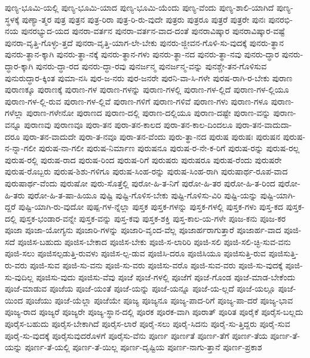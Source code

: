 {ಪುಣ್ಯ-ಭೂಮಿ-ಯಲ್ಲಿ
ಪುಣ್ಯ-ಭೂಮಿ-ಯಾದ
ಪುಣ್ಯ-ಭೂಮಿ-ಯೆಂದು
ಪುಣ್ಯ-ವೆಂದು
ಪುಣ್ಯ-ಶಾಲಿ-ಯಾಗಿದೆ
ಪುಣ್ಯ-ಸ್ಥಳಕ್ಕೆ
ಪುಣ್ಯಾ-ತ್ಮರ
ಪುತ್ರ
ಪುತ್ರನ
ಪುತ್ರ-ರಿರಾ
ಪುತ್ರ-ರಿ-ರು-ವುದೇ
ಪುತ್ರರು
ಪುತ್ರರೂ
ಪುತ್ರರೆ
ಪುತ್ರರೇ
ಪುನಃ
ಪುನರಭಿ-ನಯ
ಪುನರಭ್ಯುದ-ಯದ
ಪುನರಾ-ವರ್ತನ
ಪುನರಾ-ವರ್ತನ-ವಾದ-ದಂತೆ
ಪುನರಾವಿಷ್ಕಾರ
ಪುನರಾವಿಷ್ಕಾರ-ವಷ್ಟೆ
ಪುನರಾ-ವೃತ್ತಿ-ಗೊಳ್ಳು-ತ್ತದೆ
ಪುನರಾ-ವೃತ್ತಿ-ಯಾಗ-ಲೇ-ಬೇಕು
ಪುನರು-ಜ್ಜೀವನ-ಗೊಳಿ-ಸು-ವುದಕ್ಕೆ
ಪುನರು-ತ್ಥಾನ
ಪುನರು-ತ್ಥಾನ-ಕ್ಕಾಗಿ
ಪುನರು-ತ್ಥಾ-ನಕ್ಕೆ
ಪುನರು-ತ್ಥಾನ-ಗಳು
ಪುನರು-ತ್ಥಾ-ನದ
ಪುನರು-ತ್ಥಾ-ನವು
ಪುನರು-ದ್ಧಾರ
ಪುನರು-ದ್ಧಾರ-ಕ್ಕಾಗಿ
ಪುನರು-ದ್ಧಾ-ರದ
ಪುನರು-ದ್ಧಾ-ರವು
ಪುನರ್ಜನ್ಮ
ಪುನರ್ಜನ್ಮ-ವನ್ನು
ಪುನಶ್ಚೇ-ತನ-ಗೊಳಿಸುವ
ಪುನುರುದ್ಧಾರ-ಕ್ಕಿಂತ
ಪುಮಾ-ನಸಿ
ಪುರ-ಜ-ನರು
ಪುರ-ಜನರೇ
ಪುರನಿ-ವಾ-ಸಿ-ಗಳೇ
ಪುರಷ-ರಾಗಿ-ರ-ಬೇಕು
ಪುರಾಣ
ಪುರಾಣಕ್ಕೂ
ಪುರಾಣಕ್ಕೆ
ಪುರಾಣ-ಗಳ
ಪುರಾಣ-ಗಳನ್ನು
ಪುರಾಣ-ಗಳಲ್ಲಿ
ಪುರಾಣ-ಗಳ-ಲ್ಲಿದೆ
ಪುರಾಣ-ಗಳ-ಲ್ಲಿಯೂ
ಪುರಾಣ-ಗಳ-ಲ್ಲಿ-ರುವ
ಪುರಾಣ-ಗಳ-ಲ್ಲಿವೆ
ಪುರಾಣ-ಗಳಿಗೆ
ಪುರಾಣ-ಗಳಿವೆ
ಪುರಾಣ-ಗಳು
ಪುರಾಣ-ಗಳೂ
ಪುರಾಣ-ಗಳೆಲ್ಲಾ
ಪುರಾಣ-ಗಳೇನೋ
ಪುರಾಣದ
ಪುರಾಣ-ದಲ್ಲಿ
ಪುರಾಣ-ದಲ್ಲಿಯೂ
ಪುರಾಣ-ದಷ್ಟೇ
ಪುರಾಣ-ವನ್ನು
ಪುರಾಣ-ವನ್ನೂ
ಪುರಾಣವು
ಪುರಾಣವೂ
ಪುರಾ-ತನ
ಪುರಾ-ತನ-ಕಾಲದ
ಪುರಾ-ತನ-ಕಾಲ-ದಿಂದಲೂ
ಪುರಾ-ತನ-ವಾದುದಾ-ದರೂ
ಪುರಾ-ತನ-ವಾದುದೇ
ಪುರಾ-ತ-ನವೂ
ಪುರಾ-ತನ-ವೆಂದು
ಪುರು-ತ್ಥಾ-ನದ
ಪುರುಷ
ಪುರುಷಃ
ಪುರುಷನ
ಪುರುಷ-ನ-ನ್ನಾ-ಗಲೀ
ಪುರುಷ-ನಾ-ಗಲೀ
ಪುರುಷ-ನಿರ್ಮಾಣ
ಪುರುಷನೂ
ಪುರುಷ-ರ-ನೇ-ಕ-ರಿಗೆ
ಪುರುಷ-ರನ್ನು
ಪುರುಷ-ರಲ್ಲ
ಪುರುಷ-ರಲ್ಲಿ
ಪುರುಷ-ರಾದ
ಪುರುಷ-ರಿಂದ
ಪುರುಷ-ರಿಗೆ
ಪುರುಷರು
ಪುರುಷರೂ
ಪುರುಷ-ರೆಂದು
ಪುರುಷರೇ
ಪುರುಷ-ರೊಬ್ಬರು
ಪುರುಷ-ಶಿಶು-ಗಳಿಗೂ
ಪುರುಷ-ಸಿಂಹ-ರನ್ನು
ಪುರುಷ-ಸಿಂಹ-ರಾಗಿ
ಪುರುಷಾರ್ಥ-ರೂಪ-ವಾದ
ಪುರುಷಾರ್ಥ-ವೆಂದು
ಪುರುಷೋ
ಪುರು-ಸೊತ್ತೆಲ್ಲಿ
ಪುರೋ-ಹಿ-ತ-ನಿಗೆ
ಪುರೋ-ಹಿ-ತರ
ಪುರೋ-ಹಿ-ತ-ರಿಂದ
ಪುರೋ-ಹಿ-ತರು
ಪುರೋ-ಹಿ-ತ-ಷಾ-ಹಿಯೂ
ಪುಷ್ಟಿ
ಪುಷ್ಟಿ-ಗೊಳಿಸ-ಬೇಕು
ಪುಷ್ಟಿ-ಗೊಳಿಸು-ವಿರಿ
ಪುಷ್ಟಿ-ಯನ್ನು
ಪುಷ್ಟಿ-ಯಾಗಿ-ದ್ದರೆ
ಪುಷ್ಟಿ-ಯಾಗಿ-ರು-ವುದೋ
ಪುಷ್ಪ-ಗಳ-ನ್ನೆಲ್ಲಾ
ಪುಸ್ತಕ
ಪುಸ್ತಕ-ಗಳನ್ನು
ಪುಸ್ತಕ-ಗಳಲ್ಲಿ
ಪುಸ್ತಕ-ಗಳು
ಪುಸ್ತ-ಕದ
ಪುಸ್ತಕ-ದಲ್ಲಿ
ಪುಸ್ತಕ-ಭಂಡಾರ-ವನ್ನೇ
ಪುಸ್ತಕ-ವನ್ನು
ಪುಸ್ತ-ಕವು
ಪುಸ್ತಕ-ಶಕ್ತಿ
ಪುಸ್ತ-ಕಾಲ-ಯ-ಗಳೇ
ಪೂಜ-ಕನು
ಪೂಜ-ಕರ
ಪೂಜಾ
ಪೂಜಾ-ಯೋಗ್ಯನು
ಪೂಜಾರಿ-ಗಳನ್ನು
ಪೂಜಾರಿ-ವೃಂದ-ವೆಲ್ಲ
ಪೂಜಾರ್ಹರಾಗುತ್ತಾರೆ
ಪೂಜಾರ್ಹ-ವಾದ
ಪೂಜಿ-ಸದೆ
ಪೂಜಿಸ-ಬಹುದು
ಪೂಜಿಸ-ಬೇಕಾದ
ಪೂಜಿಸ-ಬೇಕು
ಪೂಜಿ-ಸ-ಲಾರಿರಿ
ಪೂಜಿ-ಸಲಿ
ಪೂಜಿ-ಸಲಿ-ಚ್ಛಿ-ಸುವ-ವನು
ಪೂಜಿ-ಸಲು
ಪೂಜಿಸಲ್ಪಡುತ್ತಿ-ರುವಳು
ಪೂಜಿಸ-ಲ್ಪ-ಡುವ
ಪೂಜಿಸಿ-ದರೂ
ಪೂಜಿಸಿಯೂ
ಪೂಜಿಸುತ್ತಿ-ರುವ
ಪೂಜಿಸುತ್ತಿ-ರು-ವರು
ಪೂಜಿ-ಸುವ
ಪೂಜಿ-ಸು-ವನು
ಪೂಜಿ-ಸು-ವರು
ಪೂಜಿಸು-ವರೊ
ಪೂಜಿ-ಸುವ-ವರು
ಪೂಜಿ-ಸು-ವುದಕ್ಕೆ
ಪೂಜಿ-ಸು-ವುದಿಲ್ಲ
ಪೂಜಿಸು-ವುದು
ಪೂಜಿಸು-ವೆವು
ಪೂಜೆ
ಪೂಜೆ-ಗಳಲ್ಲಿ
ಪೂಜೆಗೆ
ಪೂಜೆ-ಗೊಂಡ
ಪೂಜೆ-ಮಾಡ-ಬೇಕೆಂದು
ಪೂಜೆ-ಮಾಡುವ
ಪೂಜೆಯ
ಪೂಜೆ-ಯಂತೆ
ಪೂಜೆ-ಯನ್ನು
ಪೂಜೆ-ಯನ್ನೂ
ಪೂಜೆ-ಯ-ಲ್ಲದೆ
ಪೂಜೆ-ಯಲ್ಲೂ
ಪೂಜೆ-ಯಿಂದ
ಪೂಜೆಯು
ಪೂಜೆ-ಯೆಲ್ಲಾ
ಪೂಜೆಯೇ
ಪೂಜ್ಯ
ಪೂಜ್ಯನೂ
ಪೂಜ್ಯ-ಪಾದ-ರಿಗೆ
ಪೂಜ್ಯ-ಪಾ-ದರೆ
ಪೂಜ್ಯ-ಭಾವ
ಪೂಜ್ಯ-ರಾದ
ಪೂಜ್ಯರೆ
ಪೂಜ್ಯರೇ
ಪೂಜ್ಯ-ಸ್ಥಾನ-ದಲ್ಲಿ
ಪೂರಕ
ಪೂರಕ-ವಾಗಿ
ಪೂರಾತ್
ಪೂರಿತ
ಪೂರೈಕೆ
ಪೂರೈಸ-ಬಲ್ಲದು
ಪೂರೈಸ-ಬಹುದು
ಪೂರೈಸ-ಬೇಕಾಗಿದೆ
ಪೂರೈಸ-ಲಾರೆ
ಪೂರೈ-ಸಲು
ಪೂರೈ-ಸಿದನು
ಪೂರೈ-ಸು-ತ್ತಿದ್ದರು
ಪೂರೈ-ಸುವ
ಪೂರೈ-ಸು-ವುದಕ್ಕೆ
ಪೂರೈಸುವುದರೊಳಗೆ
ಪೂರೈಸು-ವೆನು
ಪೂರ್ಣ
ಪೂರ್ಣತೆ
ಪೂರ್ಣ-ತೆಗೆ
ಪೂರ್ಣ-ತೆಯ
ಪೂರ್ಣ-ತೆ-ಯನ್ನು
ಪೂರ್ಣ-ತೆ-ಯಲ್ಲಿ
ಪೂರ್ಣ-ತೆ-ಯಿಲ್ಲ
ಪೂರ್ಣ-ದೃಷ್ಟಿಯ
ಪೂರ್ಣ-ನಾಗು-ತ್ತಾನೆ
ಪೂರ್ಣ-ಪ್ರಕಾಶ
}
